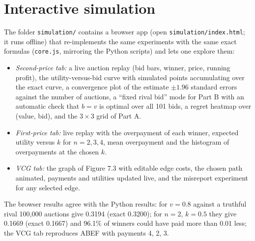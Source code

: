 \documentclass[11pt,a4paper]{article}
\begin{document}
\section{Interactive simulation}
The folder \texttt{simulation/} contains a browser app (open \texttt{simulation/index.html}; it runs offline) that re-implements the same
experiments with the same exact formulas (\texttt{core.js}, mirroring the Python scripts) and lets one explore them:
\begin{itemize}
\item \emph{Second-price tab:} a live auction replay (bid bars, winner, price, running profit), the utility-versus-bid curve with simulated points
accumulating over the exact curve, a convergence plot of the estimate $\pm1.96$ standard errors against the number of auctions,
a ``fixed rival bid'' mode for Part B with an automatic check that $b=v$ is optimal over all 101 bids, a regret heatmap over (value, bid), and the $3\times3$ grid of Part A.
\item \emph{First-price tab:} live replay with the overpayment of each winner, expected utility versus $k$ for $n=2,3,4$, mean overpayment and the
histogram of overpayments at the chosen $k$.
\item \emph{VCG tab:} the graph of Figure 7.3 with editable edge costs, the chosen path animated, payments and utilities updated live, and the misreport experiment
for any selected edge.
\end{itemize}
The browser results agree with the Python results: for $v=0.8$ against a truthful rival 100{,}000 auctions give 0.3194 (exact 0.3200); for $n=2$, $k=0.5$ they give
0.1669 (exact 0.1667) and 96.1\% of winners could have paid more than 0.01 less; the VCG tab reproduces ABEF with payments 4, 2, 3.
\end{document}
